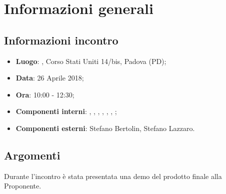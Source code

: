 \section{Informazioni generali}

\subsection{Informazioni incontro}
\begin{itemize}
\item \textbf{Luogo}: \Proponente{}, Corso Stati Uniti 14/bis, Padova (PD);
\item \textbf{Data}: 26 Aprile 2018;
\item \textbf{Ora}: 10:00 - 12:30;
\item \textbf{Componenti interni}: \Tommaso, \Mattia, \Isacco, \Luca, \Leonardo, \Cristian, \Carlo;
\item \textbf{Componenti esterni}: Stefano Bertolin, Stefano Lazzaro.
\end{itemize}

\subsection{Argomenti}
Durante l'incontro è stata presentata una demo del prodotto finale alla Proponente.

